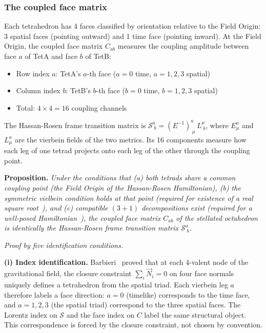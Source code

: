 \documentclass[aps,prd,preprint,superscriptaddress,showpacs,preprintnumbers,amsmath,amssymb,nofootinbib]{revtex4-2}
\begin{document}
\subsubsection*{The coupled face matrix}

Each tetrahedron has 4 faces classified by orientation relative to the Field Origin: 3 spatial faces (pointing outward) and 1 time face (pointing inward). At the Field Origin, the coupled face matrix $C_{ab}$ measures the coupling amplitude between face $a$ of TetA and face $b$ of TetB:
\begin{itemize}
\item Row index $a$: TetA's $a$-th face ($a = 0$ time, $a = 1,2,3$ spatial)
\item Column index $b$: TetB's $b$-th face ($b = 0$ time, $b = 1,2,3$ spatial)
\item Total: $4 \times 4 = 16$ coupling channels
\end{itemize}

The Hassan-Rosen frame transition matrix is $\mathcal{S}^a_{\;b} = (E^{-1})^a_{\;\mu}\,L^\mu_{\;b}$, where $E^a_\mu$ and $L^a_\mu$ are the vierbein fields of the two metrics. Its 16 components measure how each leg of one tetrad projects onto each leg of the other through the coupling point.

\vspace{0.5em}
\noindent\textbf{Proposition.} \textit{Under the conditions that (a) both tetrads share a common coupling point (the Field Origin of the Hassan-Rosen Hamiltonian), (b) the symmetric vielbein condition holds at that point (required for existence of a real square root~\cite{deffayet2013}), and (c) compatible $(3{+}1)$ decompositions exist (required for a well-posed Hamiltonian~\cite{hassankocic2018}), the coupled face matrix $C_{ab}$ of the stellated octahedron is identically the Hassan-Rosen frame transition matrix $\mathcal{S}^a_{\;b}$.}
\vspace{0.5em}

\noindent\textit{Proof by five identification conditions.}

\textbf{(i) Index identification.} Barbieri~\cite{barbieri1998} proved that at each 4-valent node of the gravitational field, the closure constraint $\sum_i \vec{N}_i = 0$ on four face normals uniquely defines a tetrahedron from the spatial triad. Each vierbein leg $a$ therefore labels a face direction: $a = 0$ (timelike) corresponds to the time face, and $a = 1,2,3$ (the spatial triad) correspond to the three spatial faces. The Lorentz index on $\mathcal{S}$ and the face index on $C$ label the same structural object. This correspondence is forced by the closure constraint, not chosen by convention.
\end{document}

